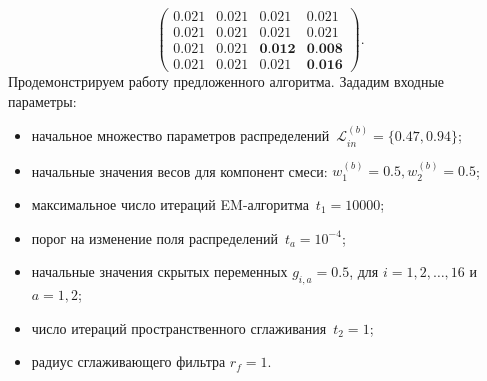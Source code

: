 \begin{equation}
    \left(
    \begin{matrix}
        0.021 & 0.021 & 0.021 & 0.021 \\
        0.021 & 0.021 & 0.021 & 0.021 \\
        0.021 & 0.021 & \textbf{0.012} & \textbf{0.008} \\
        0.021 & 0.021 & 0.021 & \textbf{0.016}
    \end{matrix}
    \right).
\end{equation}
Продемонстрируем работу предложенного алгоритма. Зададим входные параметры:
\begin{itemize}
    \item начальное множество параметров распределений~$\mathcal{L}_{in}^{(b)} = \{0.47, 0.94\}$;
    
    \item начальные значения весов для компонент смеси: $w_1^{(b)}=0.5,w_2^{(b)}=0.5$;
    
    \item максимальное число итераций EM-алгоритма~$t_1=10000$;
    
    \item порог на изменение поля распределений~$t_a=10^{-4}$;
    
    \item начальные значения скрытых переменных $g_{i,a}=0.5$, для $i=1,2,\ldots,16$ и $a=1,2$;
    
    \item число итераций пространственного сглаживания~$t_2=1$;
    
    \item радиус сглаживающего фильтра $r_f=1$.
\end{itemize}


